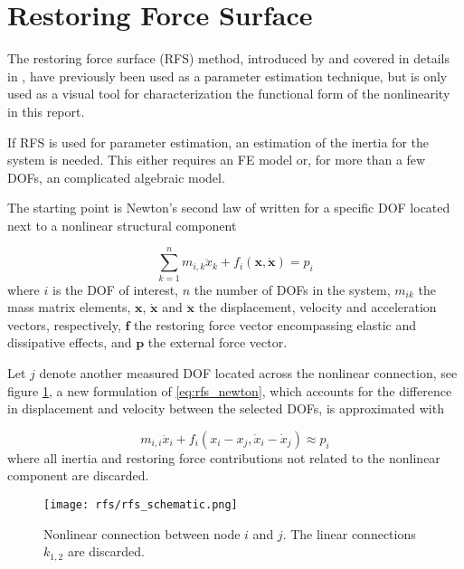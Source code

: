 \section{Restoring Force Surface}
\label{sec:rfs_description}

The restoring force surface (RFS) method, introduced by \parencite{masri1979a}
and covered in details in \autocite{worden1990a}, have previously been used as a
parameter estimation technique, but is only used as a visual tool for
characterization the functional form of the nonlinearity in this report.

If RFS is used for parameter estimation, an estimation of the inertia for the
system is needed. This either requires an FE model or, for more than a few DOFs,
an complicated algebraic model.

The starting point is Newton's second law of written for a specific DOF located
next to a nonlinear structural component

\begin{equation}
  \label{eq:rfs_newton}
  \sum_{k=1}^{n} m_{i,k} \ddot x_k + f_i(\bm x, \dot{ \bm x}) = p_i
\end{equation}
where $i$ is the DOF of interest, $n$ the number of DOFs in the system, $m_{ik}$
the mass matrix elements, $\bm x$, $\dot{\bm x}$ and $\ddot{ \bm x}$ the
displacement, velocity and acceleration vectors, respectively, $\bm f$ the
restoring force vector encompassing elastic and dissipative effects, and $\bm p$
the external force vector.

Let $j$ denote another measured DOF located across the nonlinear connection, see
figure \ref{fig:rfs_schematic}, a new formulation of \eqref{eq:rfs_newton},
which accounts for the difference in displacement and velocity between the
selected DOFs, is approximated with

\begin{equation}
  \label{eq:rfs_newton2}
  m_{i,i} \ddot x_i +  f_i (x_i - x_j , \dot x_i - \dot x_j) \approx p_i
\end{equation}
where all inertia and restoring force contributions not related to the nonlinear
component are discarded.

\begin{figure}[ht!]
  \centering
  \texttt{[image: rfs/rfs\_schematic.png]}
  \caption{Nonlinear connection between node $i$ and $j$. The linear connections
    $k_{1,2}$ are discarded.}
  \label{fig:rfs_schematic}
\end{figure}

